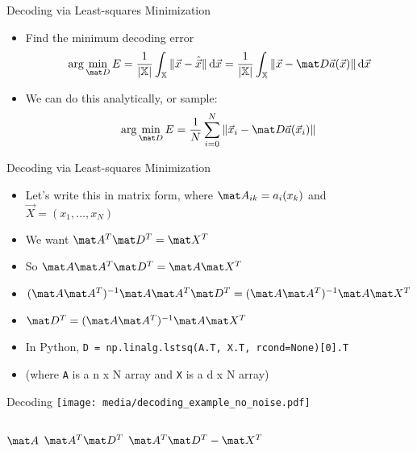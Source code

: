 \documentclass[handout,aspectratio=169]{beamer}
\begin{document}
\begin{frame}{Decoding via Least-squares Minimization}
	\begin{itemize}
		\item Find the minimum decoding error
	\begin{align*}
		\arg\min_{\mat D} E = \frac{1}{|\mathbb{X}|} \int_{\mathbb{X}} \|\vec x - \hat{\vec x}\| \,\mathrm{d}\vec x = \frac{1}{|\mathbb{X}|} \int_{\mathbb{X}} \|\vec x - \mat D \vec a(\vec x)\| \,\mathrm{d}\vec x
	\end{align*}
		\item We can do this analytically, or sample:
	\begin{align*}
	\arg\min_{\mat D} E = \frac{1}{N} \sum_{i=0}^N \|\vec x_i - \mat D \vec a(\vec x_i)\| \,
	\end{align*}
\end{itemize}
	
\end{frame}

\begin{frame}{Decoding via Least-squares Minimization}
	\begin{itemize}
		\item Let's write this in matrix form, where $\mat A_{ik} = a_i(x_k)$ and $\vec X = (x_1, \ldots, x_N)$
		\item We want $\mat A^T \mat D^T = \mat X^T$
		\item So $\mat A \mat A^T \mat D^T = \mat A \mat X^T$
		\item $(\mat A \mat A^T)^{-1}\mat A \mat A^T \mat D^T = (\mat A \mat A^T)^{-1}\mat A \mat X^T$ 
		\item $\mat D^T = (\mat A \mat A^T)^{-1}\mat A \mat X^T$
		\item In Python, \texttt{D = np.linalg.lstsq(A.T, X.T, rcond=None)[0].T}
		\item (where \texttt{A} is a n x N array and \texttt{X} is a d x N array)
	\end{itemize}
\end{frame}

\begin{frame}{Decoding}
	\texttt{[image: media/decoding\_example\_no\_noise.pdf]}
	\begin{columns}
		$\mat A$
		$\mat A^T \mat D^T$
		$\mat A^T \mat D^T - \mat X^T$
	\end{columns}
\end{frame}
\end{document}

